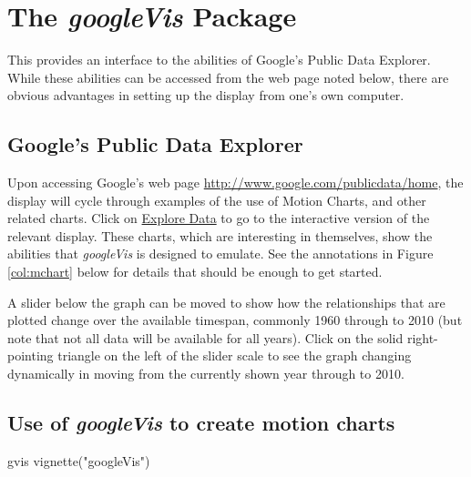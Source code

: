 \documentclass{tufte-book}\usepackage[]{graphicx}\usepackage[]{color}
\begin{document}
\section{The {\em googleVis} Package}\label{sec:gvis}

This provides an interface to the abilities of Google's Public Data
Explorer.  While these abilities can be accessed from the web page
noted below, there are obvious advantages in setting up the display
from one's own computer.

\subsection{Google's Public Data Explorer}

Upon accessing Google's web page
\url{http://www.google.com/publicdata/home}, the display will cycle
through examples of the use of Motion Charts, and other related
charts.  Click on \underline{Explore Data} to go to the interactive
version of the relevant display.  These charts, which are interesting in themselves,
show the abilities that {\em googleVis} is designed to emulate.  See
the annotations in Figure \ref{col:mchart} below for details that
should be enough to get started.

A slider below the graph can be moved to show how the relationships
that are plotted change over the available timespan, commonly 1960
through to 2010 (but note that not all data will be available for all
years).  Click on the solid right-pointing triangle on the left of
the slider scale to see the graph changing dynamically in moving from the
currently shown year through to 2010.

\subsection{Use of {\em googleVis} to create motion charts}\label{ss:gvis}

\begin{SaveVerbatim}{gvis}
vignette("googleVis")
\end{SaveVerbatim}
\end{document}
